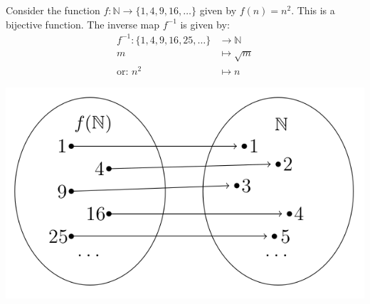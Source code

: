 \begin{example}{} \label{Bsp:Umkehrabbildung}
    Consider the function $f: \mathbb{N} \rightarrow \{1, 4, 9, 16, \ldots\}$
given by $f(n) = n^2$. This is a bijective function.
The inverse map $f^{-1}$ is given by:
\begin{align*}
    f^{-1}:\lbrace1,4,9,16,25,\dots \rbrace &\rightarrow \mathbb{N} \\
m & \mapsto \sqrt{m} \\
\text{or: } n^2 &\mapsto n
\end{align*}

\includegraphics{./examp.png}
\end{example}

